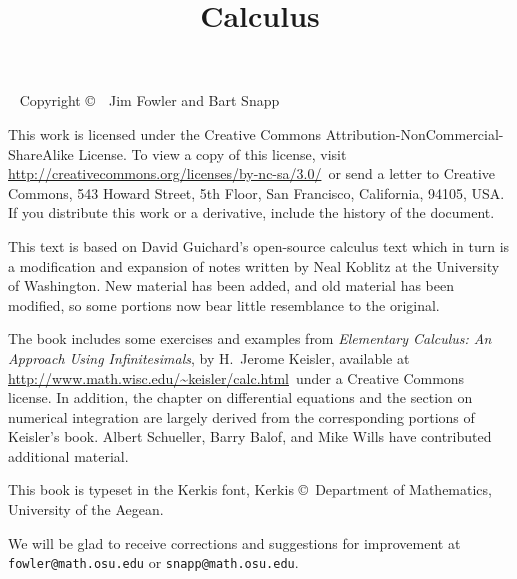 \documentclass[justified]{tufte-book}
\title{Calculus}
\begin{document}
\maketitle



\begin{fullwidth}
~\vfill
\thispagestyle{empty}
\setlength{\parindent}{0pt}
\setlength{\parskip}{\baselineskip}
Copyright \copyright\ \the\year\ Jim Fowler and Bart Snapp

This work is licensed under the Creative Commons
Attribution-NonCommercial-ShareAlike License. To view a copy of this
license, visit
\url{http://creativecommons.org/licenses/by-nc-sa/3.0/}~or send a
letter to Creative Commons, 543 Howard Street, 5th Floor, San
Francisco, California, 94105, USA. If you distribute this work or a
derivative, include the history of the document.

\noindent
This text is based on David Guichard's open-source calculus text which
in turn is a modification and expansion of notes written by Neal
Koblitz at the University of Washington. New material has been added,
and old material has been modified, so some portions now bear little
resemblance to the original.

\noindent The book includes some exercises and examples from {\it
  Elementary Calculus: An Approach Using Infinitesimals}, by H.~Jerome
Keisler, available at
\url{http://www.math.wisc.edu/~keisler/calc.html}~under a Creative
Commons license. In addition, the chapter on differential equations
and the section on numerical integration are largely derived from the
corresponding portions of Keisler's book.  Albert Schueller, Barry
Balof, and Mike Wills have contributed additional material.

\noindent This book is typeset in the Kerkis font, 
Kerkis \copyright~Department of Mathematics, University of the Aegean.

\noindent We will be glad to receive corrections and suggestions for
improvement at \texttt{fowler@math.osu.edu} or
\texttt{snapp@math.osu.edu}.

\end{fullwidth}

\tableofcontents


\end{document}
